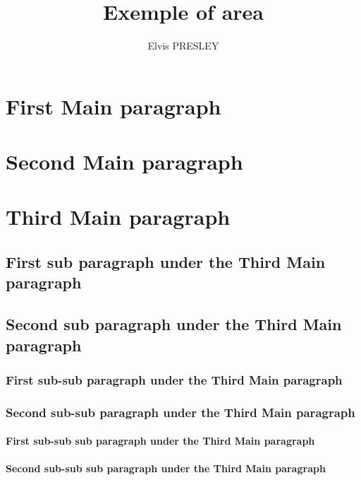 \documentclass{vijreport}
\begin{document}
	\title{Exemple of area}
	\author{Elvis PRESLEY}
	\maketitle
	\tableofcontents
	\section{First Main paragraph}
	\section{Second Main paragraph}
	\section{Third Main paragraph}
	\subsection{First sub paragraph under the Third Main paragraph}
	\subsection{Second sub paragraph under the Third Main paragraph}
	\subsubsection{First sub-sub paragraph under the Third Main
	paragraph}
	\subsubsection{Second sub-sub paragraph under the Third Main
	paragraph}

	\paragraph{First sub-sub sub paragraph under the Third Main
	paragraph}
	\paragraph{Second sub-sub sub paragraph under the Third Main
	paragraph}
\end{document}
